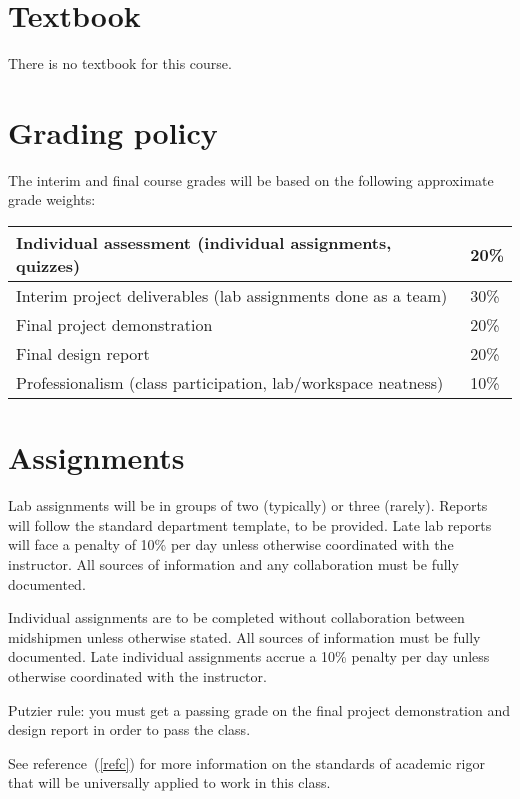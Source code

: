 \documentclass[11pt,courier]{navymemo}
\begin{document}
\section{Textbook} There is no textbook for this course.
 
\section{Grading policy} The interim and final course grades will be based on the following approximate grade weights:
\begin{table}[h]
\begin{center}
\begin{tabular}{|l|l|}\hline
Individual assessment (individual assignments, quizzes) & 20\% \\\hline
Interim project deliverables (lab assignments done as a team) & 30\% \\ \hline
Final project demonstration & 20\% \\ \hline
Final design report & 20\% \\ \hline
Professionalism (class participation, lab/workspace neatness) & 10\% \\ \hline
\end{tabular}
\end{center}
\end{table}

\section{Assignments} Lab assignments will be in groups of two (typically) or three (rarely). Reports will follow the standard department template, to be provided. Late lab reports will face a penalty of 10\% per day unless otherwise coordinated with the instructor. All sources of information and any collaboration must be fully documented.
 
Individual assignments are to be completed without collaboration between midshipmen unless otherwise stated. All sources of information must be fully documented. Late individual assignments accrue a 10\% penalty per day unless otherwise coordinated with the instructor.
 
Putzier rule: you must get a passing grade on the final project demonstration and design report in order to pass the class.

See reference~(\ref{refc}) for more information on the standards of academic rigor that will be universally applied to work in this class.
 
\end{document}
